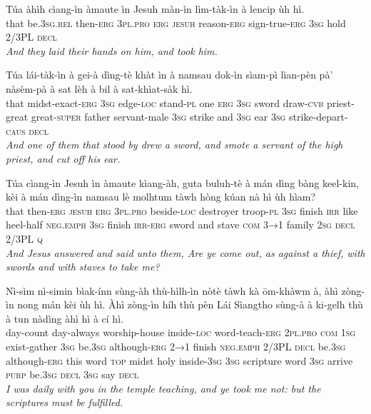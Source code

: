 \documentclass[11pt,a4paper]{article}
\begin{document}
\begin{exe}
\gll Túa àhìh cìang-ìn àmaute ìn Jesuh màn-ìn lìm-tàk-ìn à lencip ùh hì. \\
     that be.\textsc{3sg}.\textsc{rel} then-\textsc{erg} \textsc{3pl}.\textsc{pro} \textsc{erg} \textsc{jesuh} reason-\textsc{erg} sign-true-\textsc{erg} \textsc{3sg} hold 2/3PL \textsc{decl} \\
\glt \textcolor{kjvcolor}{\textit{And they laid their hands on him, and took him.}}

\gll Túa lái-tàk-ìn à gei-à dìng-tè khàt ìn à namsau dok-ìn sìam-pì lìan-pèn pà' nàsèm-pà à sat lèh à bil à sat-khìat-sàk hì. \\
     that midst-exact-\textsc{erg} \textsc{3sg} edge-\textsc{loc} stand-\textsc{pl} one \textsc{erg} \textsc{3sg} sword draw-\textsc{cvb} priest-great great-\textsc{super} father servant-male \textsc{3sg} strike and \textsc{3sg} ear \textsc{3sg} strike-depart-\textsc{caus} \textsc{decl} \\
\glt \textcolor{kjvcolor}{\textit{And one of them that stood by drew a sword, and smote a servant of the high priest, and cut off his ear.}}

\gll Túa cìang-ìn Jesuh ìn àmaute kìang-àh, guta buluh-tè à mán dìng bàng keel-kin, kèi à mán dìng-ìn namsau lè molhtum tàwh hòng kúan nà hì ùh hìam? \\
     that then-\textsc{erg} \textsc{jesuh} \textsc{erg} \textsc{3pl}.\textsc{pro} beside-\textsc{loc} destroyer troop-\textsc{pl} \textsc{3sg} finish \textsc{irr} like heel-half \textsc{neg}.\textsc{emph} \textsc{3sg} finish \textsc{irr}-\textsc{erg} sword and stave \textsc{com} \textsc{3→1} family \textsc{2sg} \textsc{decl} 2/3PL \textsc{q} \\
\glt \textcolor{kjvcolor}{\textit{And Jesus answered and said unto them, Are ye come out, as against a thief, with swords and with staves to take me?}}

\gll Nì-sìm nì-simin bìak-ínn sùng-àh thù-hìlh-ìn nòtè tàwh kà ōm-khàwm à, àhì zòng-ìn nong mán kèi ùh hì. Àhì zòng-ìn híh thù pèn Lái Sìangtho sùng-à à ki-gelh thù à tun nàdìng àhì hì à cí hì. \\
     day-count day-always worship-house inside-\textsc{loc} word-teach-\textsc{erg} \textsc{2pl}.\textsc{pro} \textsc{com} \textsc{1sg} exist-gather \textsc{3sg} be.\textsc{3sg} although-\textsc{erg} \textsc{2→1} finish \textsc{neg}.\textsc{emph} 2/3PL \textsc{decl} be.\textsc{3sg} although-\textsc{erg} this word \textsc{top} midst holy inside-\textsc{3sg} \textsc{3sg} scripture word \textsc{3sg} arrive \textsc{purp} be.\textsc{3sg} \textsc{decl} \textsc{3sg} say \textsc{decl} \\
\glt \textcolor{kjvcolor}{\textit{I was daily with you in the temple teaching, and ye took me not: but the scriptures must be fulfilled.}}


\end{exe}
\end{document}
